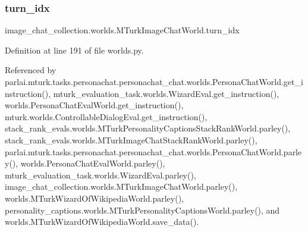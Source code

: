 \mbox{\label{classimage__chat__collection_1_1worlds_1_1MTurkImageChatWorld_acb6317fe3c0f3ca2c81ef344e49e15d4}} 
\subsubsection{\texorpdfstring{turn\+\_\+idx}{turn\_idx}}
{\footnotesize\ttfamily image\+\_\+chat\+\_\+collection.\+worlds.\+M\+Turk\+Image\+Chat\+World.\+turn\+\_\+idx}



Definition at line 191 of file worlds.\+py.



Referenced by parlai.\+mturk.\+tasks.\+personachat.\+personachat\+\_\+chat.\+worlds.\+Persona\+Chat\+World.\+get\+\_\+instruction(), mturk\+\_\+evaluation\+\_\+task.\+worlds.\+Wizard\+Eval.\+get\+\_\+instruction(), worlds.\+Persona\+Chat\+Eval\+World.\+get\+\_\+instruction(), mturk.\+worlds.\+Controllable\+Dialog\+Eval.\+get\+\_\+instruction(), stack\+\_\+rank\+\_\+evals.\+worlds.\+M\+Turk\+Personality\+Captions\+Stack\+Rank\+World.\+parley(), stack\+\_\+rank\+\_\+evals.\+worlds.\+M\+Turk\+Image\+Chat\+Stack\+Rank\+World.\+parley(), parlai.\+mturk.\+tasks.\+personachat.\+personachat\+\_\+chat.\+worlds.\+Persona\+Chat\+World.\+parley(), worlds.\+Persona\+Chat\+Eval\+World.\+parley(), mturk\+\_\+evaluation\+\_\+task.\+worlds.\+Wizard\+Eval.\+parley(), image\+\_\+chat\+\_\+collection.\+worlds.\+M\+Turk\+Image\+Chat\+World.\+parley(), worlds.\+M\+Turk\+Wizard\+Of\+Wikipedia\+World.\+parley(), personality\+\_\+captions.\+worlds.\+M\+Turk\+Personality\+Captions\+World.\+parley(), and worlds.\+M\+Turk\+Wizard\+Of\+Wikipedia\+World.\+save\+\_\+data().

\mbox{\label{classimage__chat__collection_1_1worlds_1_1MTurkImageChatWorld_a0be08870bfc570382e035bc0b6119b62}} 
